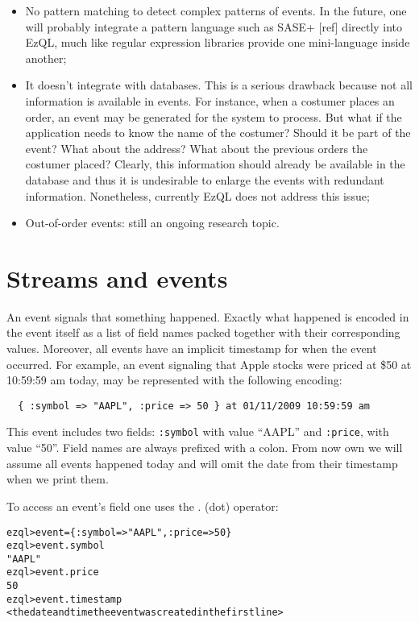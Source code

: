 \documentclass{report}
\newenvironment{evaluation}
{
  \framed
  \begin{alltt}
}
{
  \end{alltt}
  \endframed
}
\begin{document}
\begin{itemize}
\item No pattern matching to detect complex patterns of events. In the
  future, one will probably integrate a pattern language such as SASE+
  [ref] directly into EzQL, much like regular expression libraries
  provide one mini-language inside another;
\item It doesn't integrate with databases. This is a serious drawback
  because not all information is available in events. For instance,
  when a costumer places an order, an event may be generated for the
  system to process. But what if the application needs to know the
  name of the costumer? Should it be part of the event? What about the
  address? What about the previous orders the costumer placed?
  Clearly, this information should already be available in the
  database and thus it is undesirable to enlarge the events with
  redundant information. Nonetheless, currently EzQL does not address
  this issue;
\item Out-of-order events: still an ongoing research topic.
\end{itemize}

\chapter{Streams and events}
\label{chap:streams-events}

An event signals that something happened. Exactly what happened is
encoded in the event itself as a list of field names packed together
with their corresponding values. Moreover, all events have an implicit
timestamp for when the event occurred. For example, an event signaling
that Apple stocks were priced at \$50 at 10:59:59 am today, may be
represented with the following encoding:

\begin{verbatim}
  { :symbol => "AAPL", :price => 50 } at 01/11/2009 10:59:59 am
\end{verbatim}

This event includes two fields: \verb=:symbol= with value ``AAPL'' and
\verb=:price=, with value ``50''. Field names are always prefixed with
a colon. From now own we will assume all events happened today and
will omit the date from their timestamp when we print them.

To access an event's field one uses the . (dot) operator:

\begin{evaluation}
  ezql> event = \{ :symbol => "AAPL", :price => 50 \}
  ezql> event.symbol
  "AAPL"
  ezql> event.price
  50
  ezql> event.timestamp
  <the date and time the event was created in the first line>
\end{evaluation}
\end{document}
